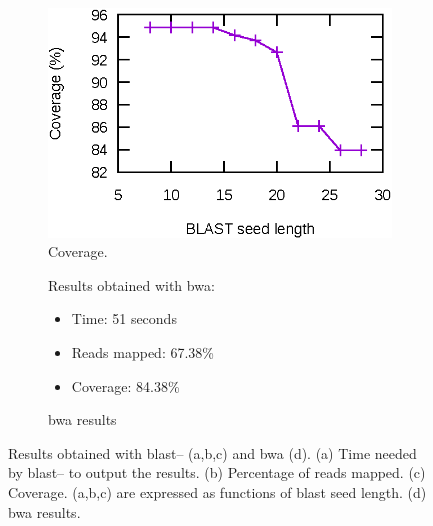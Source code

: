 \begin{figure}
    \begin{subfigure}[b]{0.5\textwidth}
        \includegraphics{img/coverage}
        \caption{Coverage.}
        \label{fig:coverage}
    \end{subfigure}
    \hfill
    \begin{subfigure}[b]{0.5\textwidth}
        \begin{flushright}
        \begin{minipage}[b]{0.75\textwidth}
        Results obtained with \gls{bwa}:
        \vspace{1.5ex}
        \begin{itemize}
            \item Time: 51 seconds
            \vspace{1.5ex}
            \item Reads mapped: 67.38\%
            \vspace{1.5ex}
            \item Coverage: 84.38\%
            \vspace{1.5ex}
        \end{itemize}
        \end{minipage}
        \end{flushright}
        \vspace{1.5cm}
        \caption{\acrshort{bwa} results}
        \label{fig:bwaResults}
    \end{subfigure}
    \caption[Results obtained with \acrshort{blast}--\blastobam{} and \acrshort{bwa}]{Results obtained with \acrshort{blast}--\blastobam{} (a,b,c) and \acrshort{bwa} (d).
    (a) Time needed by \acrshort{blast}--\blastobam{} to output the results. (b) Percentage of reads mapped. (c) Coverage. (a,b,c) are expressed as functions of \acrshort{blast} seed length.
    (d) \acrshort{bwa} results.}
    \label{fig:results}
\end{figure}


